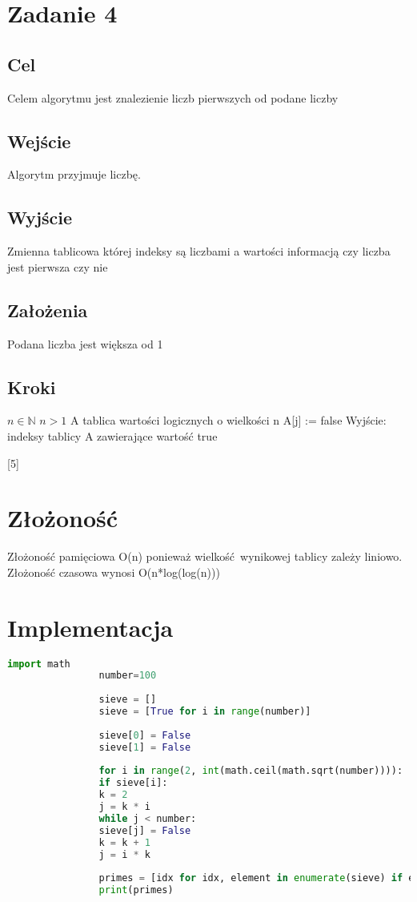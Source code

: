 \documentclass{article}
\begin{document}
		\section{Zadanie 4}
			\subsection{Cel}
			Celem algorytmu jest znalezienie liczb pierwszych od podane liczby
			\subsection{Wejście}
			Algorytm przyjmuje liczbę.
			\subsection{Wyjście}
			Zmienna tablicowa której indeksy są liczbami a wartości informacją czy liczba jest pierwsza czy nie
			\subsection{Założenia}
			Podana liczba jest większa od 1
			\subsection{Kroki}
			\begin{algorithmic}[5]
				\Require $n \in  \mathbb{N}$
				\Ensure $n > 1$
				\State A tablica wartości logicznych o wielkości n
							\State A[j] := false
						\EndFor
					\EndIf
				\EndFor
				\State Wyjście: indeksy tablicy A zawierające wartość true
			\end{algorithmic}[5]
		\section{Złożoność}
			Złożoność pamięciowa O(n) ponieważ wielkość wynikowej tablicy zależy liniowo.
			Złożoność czasowa wynosi O(n*log(log(n)))
		\section{Implementacja}
			\begin{lstlisting}[language=Python, caption=implementacja sita Erostenesa]
				import math
				number=100
				
				sieve = []
				sieve = [True for i in range(number)]
				
				sieve[0] = False
				sieve[1] = False
				
				for i in range(2, int(math.ceil(math.sqrt(number)))):
				if sieve[i]:
				k = 2
				j = k * i
				while j < number:
				sieve[j] = False
				k = k + 1
				j = i * k
				
				primes = [idx for idx, element in enumerate(sieve) if element == True]
				print(primes)
			\end{lstlisting}
\end{document}
